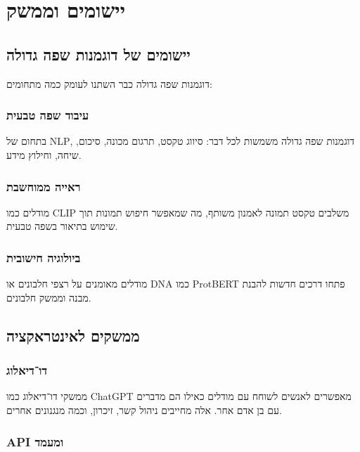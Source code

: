 \chapter{יישומים וממשק}

\section{יישומים של דוגמנות שפה גדולה}

דוגמנות שפה גדולה כבר השתנו לעומק כמה מתחומים:

\subsection{עיבוד שפה טבעית}

בתחום של \textenglish{NLP}, דוגמנות שפה גדולה משמשות לכל דבר:
סיווג טקסט, תרגום מכונה, סיכום, שיחה, וחילוץ מידע.

\subsection{ראייה ממוחשבת}

מודלים כמו \textenglish{CLIP} משלבים טקסט תמונה לאמנון משותף,
מה שמאפשר חיפוש תמונות תוך שימוש בתיאור בשפה טבעית.

\subsection{ביולוגיה חישובית}

מודלים מאומנים על רצפי חלבונים או \textenglish{DNA} כמו \textenglish{ProtBERT}
פתחו דרכים חדשות להבנת מבנה וממשק חלבונים.

\section{ממשקים לאינטראקציה}

\subsection{דו־דיאלוג}

ממשקי דו־דיאלוג כמו \textenglish{ChatGPT} מאפשרים לאנשים לשוחח עם מודלים
כאילו הם מדברים עם בן אדם אחר.
אלה מחייבים ניהול קשר, זיכרון, וכמה מנגנונים אחרים.

\subsection{\textenglish{API} ומעמד}

